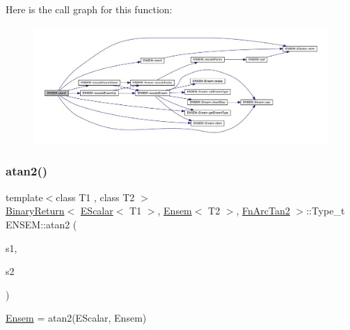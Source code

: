 Here is the call graph for this function\+:\nopagebreak
\begin{figure}[H]
\begin{center}
\leavevmode
\includegraphics[width=350pt]{d1/d9e/group__eensem_gabe797638db840fa2cddca1e1d133fc55_cgraph}
\end{center}
\end{figure}
\mbox{\label{group__eensem_ga04b957edb43f4b1eee36cecfac095807}} 
\subsubsection{\texorpdfstring{atan2()}{atan2()}\hspace{0.1cm}{\footnotesize\ttfamily [3/3]}}
{\footnotesize\ttfamily template$<$class T1 , class T2 $>$ \\
\mbox{\hyperlink{structENSEM_1_1BinaryReturn}{Binary\+Return}}$<$ \mbox{\hyperlink{classENSEM_1_1EScalar}{E\+Scalar}}$<$ T1 $>$, \mbox{\hyperlink{classENSEM_1_1Ensem}{Ensem}}$<$ T2 $>$, \mbox{\hyperlink{structENSEM_1_1FnArcTan2}{Fn\+Arc\+Tan2}} $>$\+::Type\+\_\+t E\+N\+S\+E\+M\+::atan2 (\begin{DoxyParamCaption}\item[{const \mbox{\hyperlink{classENSEM_1_1EScalar}{E\+Scalar}}$<$ T1 $>$ \&}]{s1,  }\item[{const \mbox{\hyperlink{classENSEM_1_1Ensem}{Ensem}}$<$ T2 $>$ \&}]{s2 }\end{DoxyParamCaption})\hspace{0.3cm}{\ttfamily [inline]}}



\mbox{\hyperlink{classENSEM_1_1Ensem}{Ensem}} = atan2(\+E\+Scalar, Ensem) 

